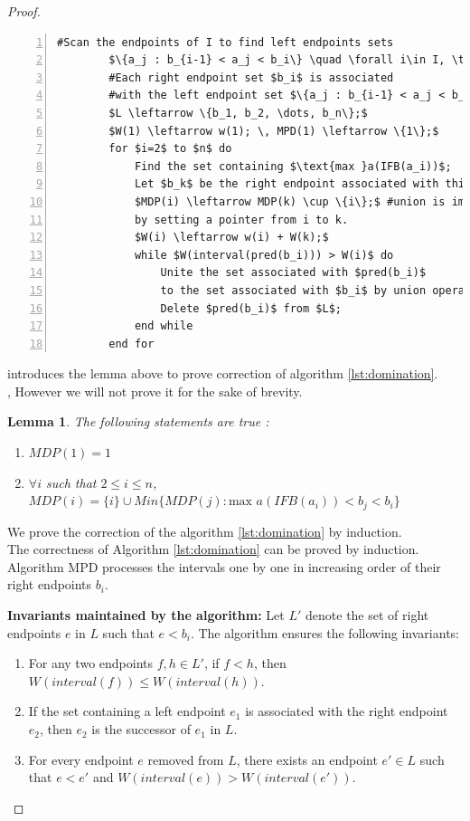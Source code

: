 \documentclass{article}
\newtheorem{lemma}{Lemma}[section]
\begin{document}
\begin{proof}
\begin{lstlisting}[mathescape=true, caption={Dominating set algorithm}, label={lst:domination}, frame=single, numbers=left]
        #Scan the endpoints of I to find left endpoints sets
        $\{a_j : b_{i-1} < a_j < b_i\} \quad \forall i\in I, \text{ using } b_0 = 0;$
        #Each right endpoint set $b_i$ is associated 
        #with the left endpoint set $\{a_j : b_{i-1} < a_j < b_i\};$
        $L \leftarrow \{b_1, b_2, \dots, b_n\};$
        $W(1) \leftarrow w(1); \, MPD(1) \leftarrow \{1\};$
        for $i=2$ to $n$ do
            Find the set containing $\text{max }a(IFB(a_i))$;
            Let $b_k$ be the right endpoint associated with this set;
            $MDP(i) \leftarrow MDP(k) \cup \{i\};$ #union is implemented
            by setting a pointer from i to k.
            $W(i) \leftarrow w(i) + W(k);$
            while $W(interval(pred(b_i))) > W(i)$ do
                Unite the set associated with $pred(b_i)$ 
                to the set associated with $b_i$ by union operation;
                Delete $pred(b_i)$ from $L$;
            end while
        end for
    \end{lstlisting}

    \cite{chang} introduces the lemma above to prove correction of algorithm \ref{lst:domination}.\\, 
    However we will not prove it for the sake of brevity.\\

    \begin{lemma}
        The following statements are true : 
        \begin{enumerate}
            \item $MDP(1) = {1}$
            \item $\forall i$ such that $2\leq i \leq n$, $MDP(i)=\{i\}\cup Min\{MDP(j) : \text{max }a(IFB(a_i))<b_j<b_i\}$
        \end{enumerate}
    \end{lemma}

    We prove the correction of the algorithm \ref{lst:domination} by induction.\\

    The correctness of Algorithm \ref{lst:domination} can be proved by induction. Algorithm MPD processes the intervals one by one in increasing order of their right endpoints $b_i$.
    
    \bigskip
    
    \textbf{Invariants maintained by the algorithm:}
    Let $L'$ denote the set of right endpoints $e$ in $L$ such that $e < b_i$. The algorithm ensures the following invariants:
    \begin{enumerate}
        \item For any two endpoints $f, h \in L'$, if $f < h$, then $W(interval(f)) \leq W(interval(h))$.
        \item If the set containing a left endpoint $e_1$ is associated with the right endpoint $e_2$, then $e_2$ is the successor of $e_1$ in $L$.
        \item For every endpoint $e$ removed from $L$, there exists an endpoint $e' \in L$ such that $e < e'$ and $W(interval(e)) > W(interval(e'))$.
    \end{enumerate}
    

\end{proof}
\end{document}
